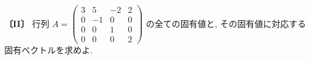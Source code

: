 \noindent\textbf{〔II〕}
行列 $A=\begin{pmatrix}
3 & 5 & -2 & 2\\
0 & -1 & 0 & 0\\
0 & 0 & 1 & 0\\
0 & 0 & 0 & 2
\end{pmatrix}$ の全ての固有値と, その固有値に対応する固有ベクトルを求めよ.
